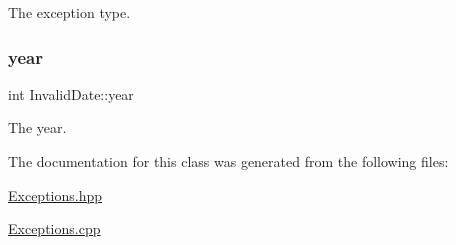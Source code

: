 The exception type. 

\hypertarget{class_invalid_date_a796e1aee06941892afc67b4ebbbd84c3}{}\label{class_invalid_date_a796e1aee06941892afc67b4ebbbd84c3} 
\subsubsection{\texorpdfstring{year}{year}}
{\footnotesize\ttfamily int Invalid\+Date\+::year\hspace{0.3cm}{\ttfamily [private]}}



The year. 



The documentation for this class was generated from the following files\+:\begin{DoxyCompactItemize}
\item 
\hyperlink{_exceptions_8hpp}{Exceptions.\+hpp}\item 
\hyperlink{_exceptions_8cpp}{Exceptions.\+cpp}\end{DoxyCompactItemize}
